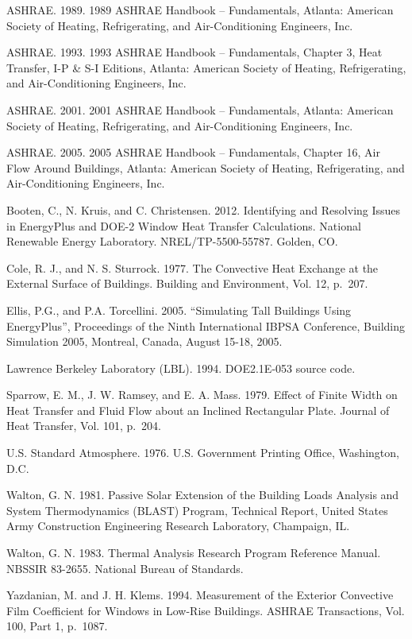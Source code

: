 ASHRAE. 1989. 1989 ASHRAE Handbook -- Fundamentals, Atlanta: American Society of Heating, Refrigerating, and Air-Conditioning Engineers, Inc.

ASHRAE. 1993. 1993 ASHRAE Handbook -- Fundamentals, Chapter 3, Heat Transfer, I-P \& S-I Editions, Atlanta: American Society of Heating, Refrigerating, and Air-Conditioning Engineers, Inc.

ASHRAE. 2001. 2001 ASHRAE Handbook -- Fundamentals, Atlanta: American Society of Heating, Refrigerating, and Air-Conditioning Engineers, Inc.

ASHRAE. 2005. 2005 ASHRAE Handbook -- Fundamentals, Chapter 16, Air Flow Around Buildings, Atlanta: American Society of Heating, Refrigerating, and Air-Conditioning Engineers, Inc.

Booten, C., N. Kruis, and C. Christensen. 2012. Identifying and Resolving Issues in EnergyPlus and DOE-2 Window Heat Transfer Calculations. National Renewable Energy Laboratory. NREL/TP-5500-55787. Golden, CO.

Cole, R. J., and N. S. Sturrock. 1977. The Convective Heat Exchange at the External Surface of Buildings. Building and Environment, Vol. 12, p.~207.

Ellis, P.G., and P.A. Torcellini. 2005. ``Simulating Tall Buildings Using EnergyPlus'', Proceedings of the Ninth International IBPSA Conference, Building Simulation 2005, Montreal, Canada, August 15-18, 2005.

Lawrence Berkeley Laboratory (LBL). 1994. DOE2.1E-053 source code.

Sparrow, E. M., J. W. Ramsey, and E. A. Mass. 1979. Effect of Finite Width on Heat Transfer and Fluid Flow about an Inclined Rectangular Plate. Journal of Heat Transfer, Vol. 101, p.~204.

U.S. Standard Atmosphere. 1976. U.S. Government Printing Office, Washington, D.C.

Walton, G. N. 1981. Passive Solar Extension of the Building Loads Analysis and System Thermodynamics (BLAST) Program, Technical Report, United States Army Construction Engineering Research Laboratory, Champaign, IL.

Walton, G. N. 1983. Thermal Analysis Research Program Reference Manual. NBSSIR 83-2655. National Bureau of Standards.

Yazdanian, M. and J. H. Klems. 1994. Measurement of the Exterior Convective Film Coefficient for Windows in Low-Rise Buildings. ASHRAE Transactions, Vol. 100, Part 1, p.~1087.
